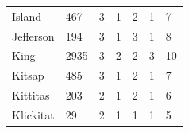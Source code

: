 \documentclass{mcmthesis}
\numberwithin{figure}{section}
\numberwithin{table}{section}
\begin{document}
\begin{table}[H]
\begin{tabular}{lllllll}
  Island       & 467                                                    & 3                                                                             & 1                                                                 & 2                                                                           & 1                                                                                     & 7                                                                          \\
  Jefferson    & 194                                                    & 3                                                                             & 1                                                                 & 3                                                                           & 1                                                                                     & 8                                                                          \\
  King         & 2935                                                   & 3                                                                             & 2                                                                 & 2                                                                           & 3                                                                                     & 10                                                                         \\
  Kitsap       & 485                                                    & 3                                                                             & 1                                                                 & 2                                                                           & 1                                                                                     & 7                                                                          \\
  Kittitas     & 203                                                    & 2                                                                             & 1                                                                 & 2                                                                           & 1                                                                                     & 6                                                                          \\
  Klickitat    & 29                                                     & 2                                                                             & 1                                                                 & 1                                                                           & 1                                                                                     & 5                                                                          \\

\end{tabular}
\end{table}
\end{document}
